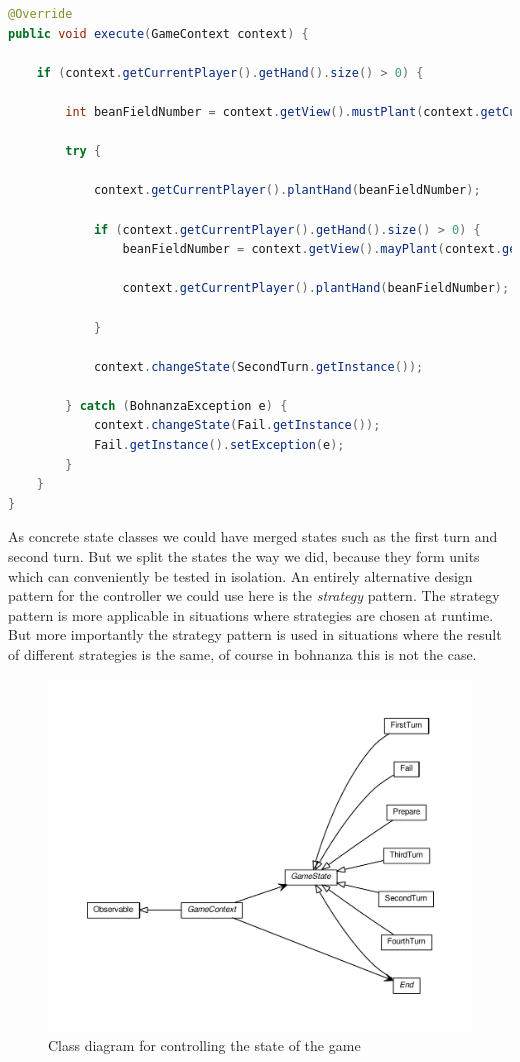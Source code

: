 \begin{lstlisting}[language=Java, caption=FirstTurn.execute(), label=lst:firstturn-execute]
@Override
public void execute(GameContext context) {

    if (context.getCurrentPlayer().getHand().size() > 0) {

        int beanFieldNumber = context.getView().mustPlant(context.getCurrentPlayer());

        try {

            context.getCurrentPlayer().plantHand(beanFieldNumber);
 
            if (context.getCurrentPlayer().getHand().size() > 0) {
                beanFieldNumber = context.getView().mayPlant(context.getCurrentPlayer());

                context.getCurrentPlayer().plantHand(beanFieldNumber);

            }

            context.changeState(SecondTurn.getInstance());

        } catch (BohnanzaException e) {
            context.changeState(Fail.getInstance());
            Fail.getInstance().setException(e);
        }
    }
}
\end{lstlisting}

As concrete state classes we could have merged states such as the first turn and second turn. But we split the states the way we did,
because they form units which can conveniently be tested in isolation. An entirely alternative design pattern for the controller we could
use here is the \emph{strategy} pattern. The strategy pattern is more applicable in situations where strategies are chosen at runtime. But more importantly
the strategy pattern is used in situations where the result of different strategies is the same, of course in bohnanza this is not the case. 

\begin{figure}[h!]
    \includegraphics[width=\textwidth]{../umlgraph/StateGraph}
    \caption{Class diagram for controlling the state of the game}
    \label{fig:design:controller}
\end{figure}

